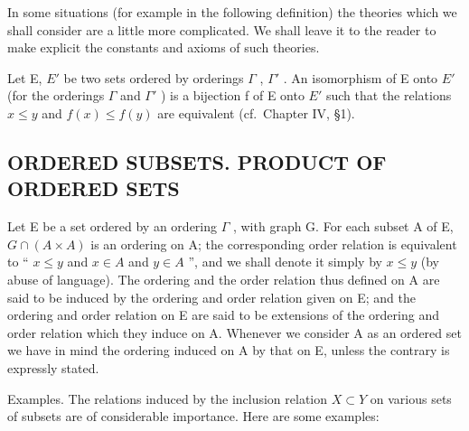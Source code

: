 In some situations (for example in the following definition) the theories which we shall consider are a little more complicated. We shall leave it to the reader to make explicit the constants and axioms of such theories.

Let E, \(E'\) be two sets ordered by orderings \(\Gamma\) , \(\Gamma'\) . An isomorphism of E onto \(E'\) (for the orderings \(\Gamma\) and \(\Gamma'\) ) is a bijection f of E onto \(E'\) such that the relations \(x \leqslant y\) and \(f(x) \leqslant f(y)\) are equivalent (cf.~Chapter IV, §1).

\subsection{ORDERED SUBSETS. PRODUCT OF ORDERED SETS}

Let E be a set ordered by an ordering \(\Gamma\) , with graph G. For each subset A of E, \(G \cap (A \times A)\) is an ordering on A; the corresponding order relation is equivalent to `` \(x \leqslant y\) and \(x \in A\) and \(y \in A\) '', and we shall denote it simply by \(x \leqslant y\) (by abuse of language). The ordering and the order relation thus defined on A are said to be induced by the ordering and order relation given on E; and the ordering and order relation on E are said to be extensions of the ordering and order relation which they induce on A. Whenever we consider A as an ordered set we have in mind the ordering induced on A by that on E, unless the contrary is expressly stated.

Examples. The relations induced by the inclusion relation \(X \subset Y\) on various sets of subsets are of considerable importance. Here are some examples:

